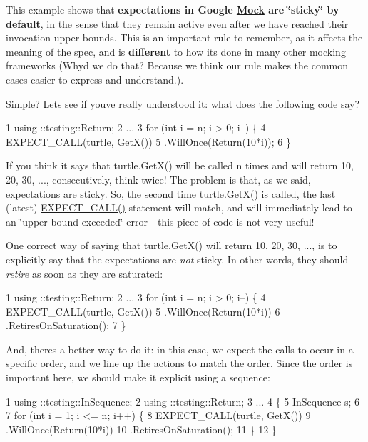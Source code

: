 This example shows that {\bfseries expectations in Google \hyperlink{classMock}{Mock} are \char`\"{}sticky\char`\"{} by default}, in the sense that they remain active even after we have reached their invocation upper bounds. This is an important rule to remember, as it affects the meaning of the spec, and is {\bfseries different} to how it\textquotesingle{}s done in many other mocking frameworks (Why\textquotesingle{}d we do that? Because we think our rule makes the common cases easier to express and understand.).

Simple? Let\textquotesingle{}s see if you\textquotesingle{}ve really understood it\+: what does the following code say?


\begin{DoxyCode}
1 using ::testing::Return;
2 ...
3 for (int i = n; i > 0; i--) \{
4   EXPECT\_CALL(turtle, GetX())
5       .WillOnce(Return(10*i));
6 \}
\end{DoxyCode}


If you think it says that {\ttfamily turtle.\+Get\+X()} will be called {\ttfamily n} times and will return 10, 20, 30, ..., consecutively, think twice! The problem is that, as we said, expectations are sticky. So, the second time {\ttfamily turtle.\+Get\+X()} is called, the last (latest) {\ttfamily \hyperlink{gmock-spec-builders_8h_a535a6156de72c1a2e25a127e38ee5232}{E\+X\+P\+E\+C\+T\+\_\+\+C\+A\+L\+L()}} statement will match, and will immediately lead to an \char`\"{}upper bound exceeded\char`\"{} error -\/ this piece of code is not very useful!

One correct way of saying that {\ttfamily turtle.\+Get\+X()} will return 10, 20, 30, ..., is to explicitly say that the expectations are {\itshape not} sticky. In other words, they should {\itshape retire} as soon as they are saturated\+:


\begin{DoxyCode}
1 using ::testing::Return;
2 ...
3 for (int i = n; i > 0; i--) \{
4   EXPECT\_CALL(turtle, GetX())
5     .WillOnce(Return(10*i))
6     .RetiresOnSaturation();
7 \}
\end{DoxyCode}


And, there\textquotesingle{}s a better way to do it\+: in this case, we expect the calls to occur in a specific order, and we line up the actions to match the order. Since the order is important here, we should make it explicit using a sequence\+:


\begin{DoxyCode}
1 using ::testing::InSequence;
2 using ::testing::Return;
3 ...
4 \{
5   InSequence s;
6 
7   for (int i = 1; i <= n; i++) \{
8     EXPECT\_CALL(turtle, GetX())
9         .WillOnce(Return(10*i))
10         .RetiresOnSaturation();
11   \}
12 \}
\end{DoxyCode}


